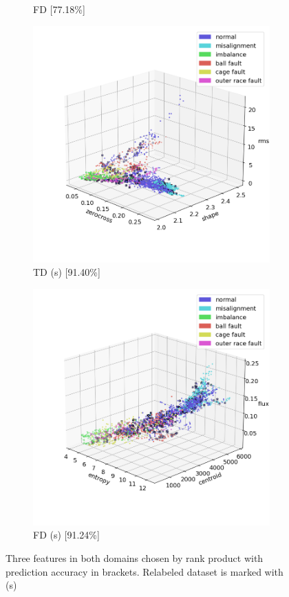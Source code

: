 \begin{figure}[t]
\begin{subfigure}[b]{0.24\textwidth}
        \caption{FD [77.18\%]}
    \end{subfigure}
    \hfill
    \begin{subfigure}[b]{0.24\textwidth}
        \includegraphics[width=\textwidth]{assets/results/labels/TD-severity.png}
        \caption{TD (s) [91.40\%]}
    \end{subfigure}
    \hfill
    \begin{subfigure}[b]{0.24\textwidth}
        \includegraphics[width=\textwidth]{assets/results/labels/FD-severity.png}
        \caption{FD (s) [91.24\%]}
    \end{subfigure} 
    \caption{Three features in both domains chosen by rank product with prediction accuracy in brackets. Relabeled dataset is marked with (s)}
\end{figure}


